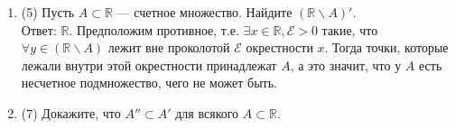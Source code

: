 \documentclass[a4paper]{article}
\begin{document}
\begin{enumerate}
	\item (5) Пусть $A\subset \mathbb R$ --- счетное множество. Найдите $(\mathbb R\smallsetminus A)'$.\\
Ответ: $\mathbb R$. Предположим противное, т.е. $\exists x \in \mathbb R, \mathcal{E} > 0$ такие, что $\forall y \in (\mathbb R\smallsetminus A)$ лежит вне проколотой $\mathcal{E}$ окрестности $x$. Тогда точки, которые лежали внутри этой окрестности принадлежат $A$, а это значит, что у $A$ есть несчетное подмножество, чего не может быть. 
	\item (7) Докажите, что $A''\subset A'$ для всякого $A\subset \mathbb R$.
\end{enumerate}
\end{document}
